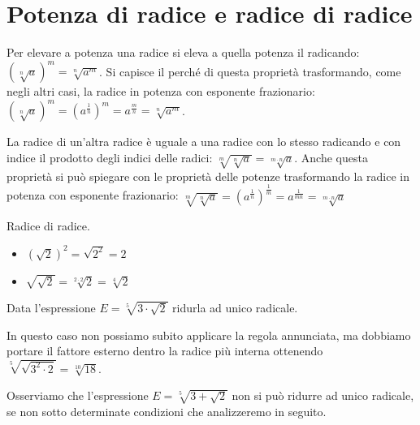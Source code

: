 \section{Potenza di radice e radice di radice}
\label{sec:radicali_potenza}

Per elevare a potenza una radice si eleva a quella potenza il radicando: 
\(\left(\sqrt[n]a\right)^m=\sqrt[n]{a^m}\).
Si capisce il perché di questa proprietà trasformando, come negli altri 
casi, la radice in potenza con esponente frazionario:
\(\left(\sqrt[n]a\right)^m=\left(a^{\frac 1 n}\right)^m=a^{\frac m n}=
 \sqrt[n]{a^m}\).

La radice di un'altra radice è uguale a una radice con lo stesso radicando 
e con indice il prodotto degli indici delle radici: 
\(\sqrt[m]{\sqrt[n]a}=\sqrt[m\cdot n]a\). 
Anche questa proprietà si può spiegare con le proprietà delle potenze 
trasformando la radice in potenza con esponente frazionario: 
\(\sqrt[m]{\sqrt[n]a}=\left(a^{\frac 1 n}\right)^{\frac 1 m}=
 a^{\frac 1{mn}}=\sqrt[m\cdot n]a\)

 \vspace{-.5em}
 \begin{esempio}
 Radice di radice.
 \begin{multicols}{2}
 \begin{itemize}
 \item \(\left(\sqrt{2}\right)^2=\sqrt{2^2}=2\)
 \item \(\sqrt{\sqrt{2}}=\sqrt[2\cdot 2]2=\sqrt[4]2\)
 \end{itemize}
 \end{multicols}
 \end{esempio}

 \begin{esempio}
 Data l'espressione \(E=\sqrt[5]{3\cdot\sqrt{2}}\) ridurla ad unico radicale.

 In questo caso non possiamo subito applicare la regola annunciata, ma 
dobbiamo  portare il fattore esterno dentro la radice più interna ottenendo 
 \(\sqrt[5]{\sqrt{3^2 \cdot 2}}=\sqrt[10]{18}\).

Osserviamo che l'espressione \(E=\sqrt[5]{3+\sqrt{2}}\) non si può ridurre 
ad unico radicale, se non sotto determinate condizioni che analizzeremo in 
seguito.
 \end{esempio}

